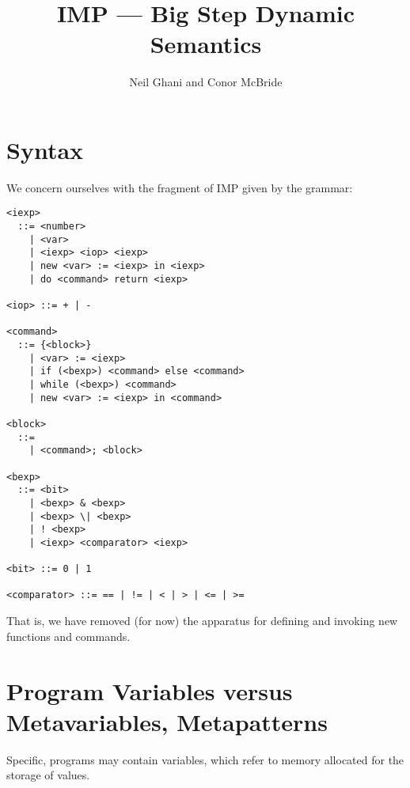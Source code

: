 \documentclass{article}
\begin{document}
\title{IMP --- Big Step Dynamic Semantics}
\author{Neil Ghani and Conor McBride}
\maketitle

\newcommand{\newe}[3]{\mathtt{new}\;#1\;\mathtt{:=}\;#2\;\mathtt{in}\;#3}
\newcommand{\newc}[3]{\mathtt{new}\;#1\;\mathtt{:=}\;#2\;\mathtt{in}\;#3}
\newcommand{\doe}[2]{\mathtt{do}\;#1\;\mathtt{return}\;#2}
\newcommand{\doret}[2]{\mathtt{do}\;#1\;\mathtt{return}\;#2}
\newcommand{\ifel}[3]{\mathtt{if}\;\mathtt{(}#1\mathtt{)}\;#2\;\mathtt{else}\;#3}
\newcommand{\whi}[2]{\mathtt{while}\; \mathtt{(}#1\mathtt{)} \;#2}
\newcommand{\ang}[1]{\langle #1 \rangle}
\newcommand{\NT}[1]{\ang{\mathit{#1}}}
\newcommand{\wk}[2]{#1 \backslash #2}

\section{Syntax}

We concern ourselves with the fragment of IMP given by the grammar:

\begin{verbatim}
<iexp>
  ::= <number>
    | <var>
    | <iexp> <iop> <iexp>
    | new <var> := <iexp> in <iexp>
    | do <command> return <iexp>

<iop> ::= + | -

<command>
  ::= {<block>}
    | <var> := <iexp>
    | if (<bexp>) <command> else <command>
    | while (<bexp>) <command>
    | new <var> := <iexp> in <command>

<block>
  ::=
    | <command>; <block>

<bexp>
  ::= <bit>
    | <bexp> & <bexp>
    | <bexp> \| <bexp>
    | ! <bexp>
    | <iexp> <comparator> <iexp>

<bit> ::= 0 | 1

<comparator> ::= == | != | < | > | <= | >=
\end{verbatim}

That is, we have removed (for now) the apparatus for defining and invoking new functions and commands.


\section{Program Variables versus Metavariables, Metapatterns}

Specific, programs may contain variables, which refer to memory allocated for the storage of values.
\end{document}
